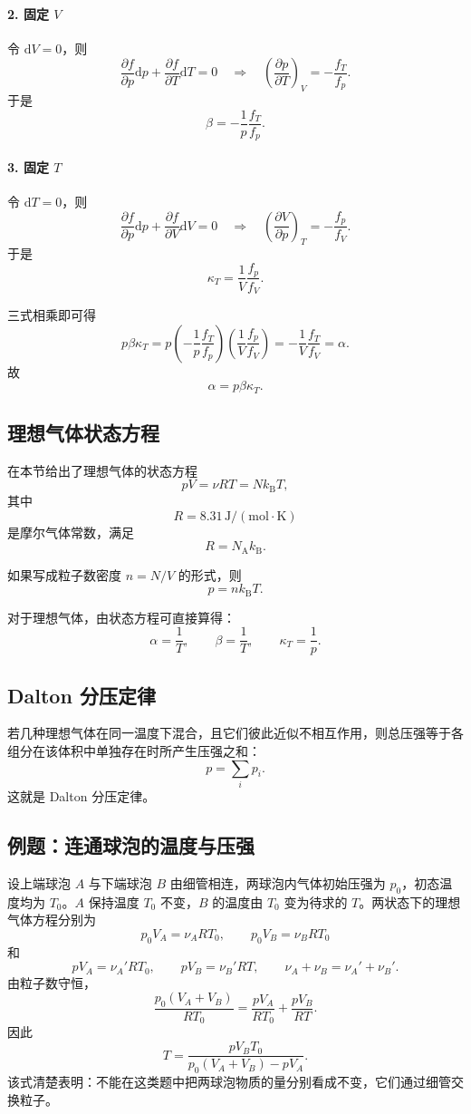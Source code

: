 \documentclass[11pt,a4paper,openany]{ctexbook}
\newcommand{\dd}{\mathrm d}
\newcommand{\kb}{k_{\mathrm B}}
\newcommand{\NA}{N_{\mathrm A}}
\newcommand{\pp}[2]{\frac{\partial #1}{\partial #2}}
\begin{document}
\paragraph{2. 固定 $V$} 令 $\dd V=0$，则
\[
\pp fp \dd p+\pp fT \dd T=0
\quad\Longrightarrow\quad
\left(\pp pT\right)_V=-\frac{f_T}{f_p}.
\]
于是
\[
\beta=-\frac1p\frac{f_T}{f_p}.
\]

\paragraph{3. 固定 $T$} 令 $\dd T=0$，则
\[
\pp fp \dd p+\pp fV \dd V=0
\quad\Longrightarrow\quad
\left(\pp Vp\right)_T=-\frac{f_p}{f_V}.
\]
于是
\[
\kappa_T=\frac1V\frac{f_p}{f_V}.
\]

三式相乘即可得
\[
p\beta\kappa_T
=
p\left(-\frac1p\frac{f_T}{f_p}\right)
\left(\frac1V\frac{f_p}{f_V}\right)
=
-\frac1V\frac{f_T}{f_V}
=\alpha.
\]
故
\[
\boxed{\alpha=p\beta\kappa_T}.
\]

\subsection*{理想气体状态方程}
在本节给出了理想气体的状态方程
\[
\boxed{pV=\nu RT=Nk_{\mathrm B}T},
\]
其中
\[
R=8.31\,\mathrm{J/(mol\cdot K)}
\]
是摩尔气体常数，满足
\[
R=\NA \kb .
\]

如果写成粒子数密度 $n=N/V$ 的形式，则
\[
p=n\kb T.
\]

对于理想气体，由状态方程可直接算得：
\[
\alpha=\frac1T,\qquad
\beta=\frac1T,\qquad
\kappa_T=\frac1p.
\]

\subsection*{Dalton 分压定律}
若几种理想气体在同一温度下混合，且它们彼此近似不相互作用，则总压强等于各组分在该体积中单独存在时所产生压强之和：
\[
\boxed{p=\sum_i p_i}.
\]
这就是 Dalton 分压定律。


\subsection*{例题：连通球泡的温度与压强}
设上端球泡 $A$ 与下端球泡 $B$ 由细管相连，两球泡内气体初始压强为 $p_0$，初态温度均为 $T_0$。$A$ 保持温度 $T_0$ 不变，$B$ 的温度由 $T_0$ 变为待求的 $T$。两状态下的理想气体方程分别为
\[
p_0V_A=\nu_A RT_0,\qquad p_0V_B=\nu_B RT_0
\]
和
\[
pV_A=\nu_A'RT_0,\qquad pV_B=\nu_B'RT,\qquad
\nu_A+\nu_B=\nu_A'+\nu_B'.
\]
由粒子数守恒，
\[
\frac{p_0(V_A+V_B)}{RT_0}
=\frac{pV_A}{RT_0}+\frac{pV_B}{RT}.
\]
因此
\[
\boxed{T=\frac{pV_BT_0}{p_0(V_A+V_B)-pV_A}.}
\]
该式清楚表明：不能在这类题中把两球泡物质的量分别看成不变，它们通过细管交换粒子。
\end{document}
